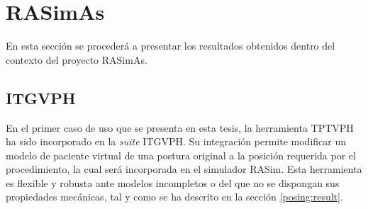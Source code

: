 \clearpage
\section{RASimAs}

En esta sección se procederá a presentar los resultados obtenidos dentro del contexto del proyecto \ac{RASimAs}. 

\subsection{ITGVPH}
\label{result:herramienta}

En el primer caso de uso que se presenta en esta tesis, la herramienta \ac{TPTVPH} ha sido incorporado en la \emph{suite} \ac{ITGVPH}. Su integración permite modificar un modelo de paciente virtual de una postura original a la posición requerida por el procedimiento, la cual será incorporada en el simulador \ac{RASim}. Esta herramienta es flexible y robusta ante modelos incompletos o del que no se dispongan sus propiedades mecánicas, tal y como se ha descrito en la sección \ref{posing:result}. 





